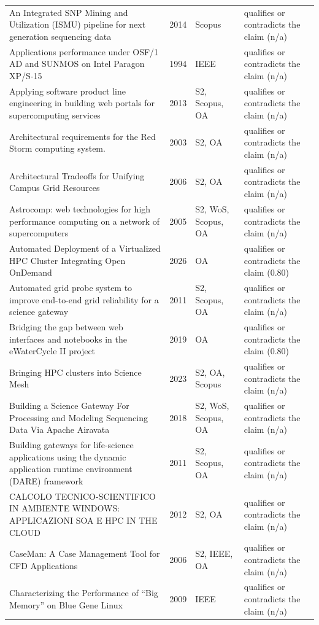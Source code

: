 \begin{longtable}{@{}%
  >{\raggedright\arraybackslash}p{}c%
  >{\raggedright\arraybackslash}p{}%
  >{\raggedright\arraybackslash}p{}@{}}
An Integrated SNP Mining and Utilization (ISMU) pipeline for next generation sequencing data & 2014 & Scopus & qualifies or contradicts the claim (n/a) \\
Applications performance under OSF/1 AD and SUNMOS on Intel Paragon XP/S-15 & 1994 & IEEE & qualifies or contradicts the claim (n/a) \\
Applying software product line engineering in building web portals for supercomputing services & 2013 & S2, Scopus, OA & qualifies or contradicts the claim (n/a) \\
Architectural requirements for the Red Storm computing system. & 2003 & S2, OA & qualifies or contradicts the claim (n/a) \\
Architectural Tradeoffs for Unifying Campus Grid Resources & 2006 & S2, OA & qualifies or contradicts the claim (n/a) \\
Astrocomp: web technologies for high performance computing on a network of supercomputers & 2005 & S2, WoS, Scopus, OA & qualifies or contradicts the claim (n/a) \\
Automated Deployment of a Virtualized HPC Cluster Integrating Open OnDemand & 2026 & OA & qualifies or contradicts the claim (0.80) \\
Automated grid probe system to improve end-to-end grid reliability for a science gateway & 2011 & S2, Scopus, OA & qualifies or contradicts the claim (n/a) \\
Bridging the gap between web interfaces and notebooks in the eWaterCycle II project & 2019 & OA & qualifies or contradicts the claim (0.80) \\
Bringing HPC clusters into Science Mesh & 2023 & S2, OA, Scopus & qualifies or contradicts the claim (n/a) \\
Building a Science Gateway For Processing and Modeling Sequencing Data Via Apache Airavata & 2018 & S2, WoS, Scopus, OA & qualifies or contradicts the claim (n/a) \\
Building gateways for life-science applications using the dynamic application runtime environment (DARE) framework & 2011 & S2, Scopus, OA & qualifies or contradicts the claim (n/a) \\
CALCOLO TECNICO-SCIENTIFICO IN AMBIENTE WINDOWS: APPLICAZIONI SOA E HPC IN THE CLOUD & 2012 & S2, OA & qualifies or contradicts the claim (n/a) \\
CaseMan: A Case Management Tool for CFD Applications & 2006 & S2, IEEE, OA & qualifies or contradicts the claim (n/a) \\
Characterizing the Performance of ``Big Memory'' on Blue Gene Linux & 2009 & IEEE & qualifies or contradicts the claim (n/a) \\

\end{longtable}
